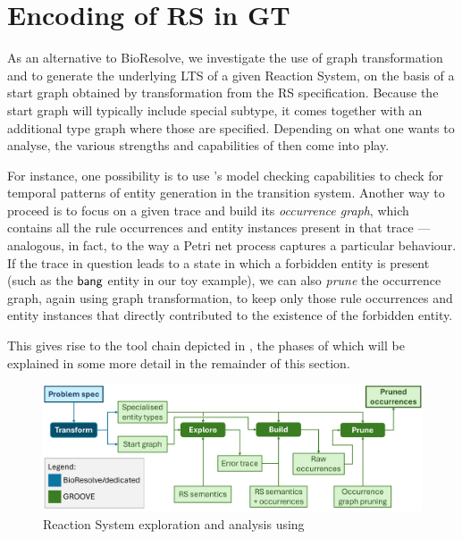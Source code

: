 
\section{Encoding of RS in GT}\label{sec:RS2GTS}

As an alternative to BioResolve, we investigate the use of graph transformation and \GROOVE to generate the underlying LTS of a given Reaction System, on the basis of a start graph obtained by transformation from the RS specification. Because the start graph will typically include special \Entity subtype, it comes together with an additional type graph where those are specified. Depending on what one wants to analyse, the various strengths and capabilities of \GROOVE then come into play.

For instance, one possibility is to use \GROOVE's model checking capabilities to check for temporal patterns of entity generation in the transition system. Another way to proceed is to focus on a given trace and build its \emph{occurrence graph}, which contains all the rule occurrences and entity instances present in that trace --- analogous, in fact, to the way a Petri net process captures a particular behaviour. If the trace in question leads to a state in which a forbidden entity is present (such as the ${\text{\sffamily bang}}$ entity in our toy example), we can also \emph{prune} the occurrence graph, again using graph transformation, to keep only those rule occurrences and entity instances that directly contributed to the existence of the forbidden entity.

This gives rise to the tool chain depicted in , the phases of which will be explained in some more detail in the remainder of this section.	

\begin{figure}
\centering
\includegraphics[scale=.25]{figs/chain}
\caption{Reaction System exploration and analysis using \GROOVE}
\label{fig:chain}
\end{figure}

